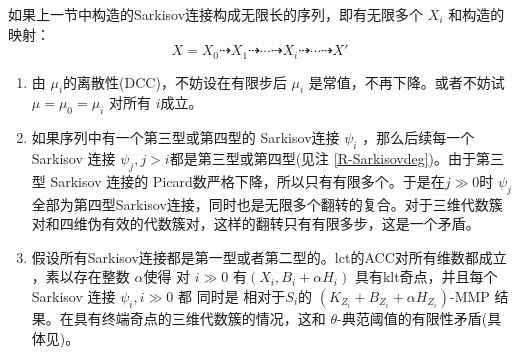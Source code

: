 如果上一节中构造的Sarkisov连接构成无限长的序列，即有无限多个 $ X_i $ 和构造的映射：
\[ X=X_0\dashrightarrow X_1\dashrightarrow \cdots\dashrightarrow X_i \dashrightarrow\cdots\dashrightarrow X'\]
\begin{enumerate}
  \item 由 $\mu_{i}$的离散性(DCC)，不妨设在有限步后 $\mu_{i}$ 是常值，不再下降。或者不妨试 $\mu=\mu_{0}=\mu_{i}$ 对所有 $i$成立。
  \item 如果序列中有一个第三型或第四型的 Sarkisov连接 $\psi_i$ ，那么后续每一个 Sarkisov 连接 $\psi_j, j>i$都是第三型或第四型(见注 \ref{R-Sarkisovdeg})。由于第三型 Sarkisov 连接的 Picard数严格下降，所以只有有限多个。于是在$j\gg 0$时 $\psi_j$ 全部为第四型Sarkisov连接，同时也是无限多个翻转的复合。对于三维代数簇对和四维伪有效的代数簇对，这样的翻转只有有限多步，这是一个矛盾。
  \item 假设所有Sarkisov连接都是第一型或者第二型的。lct的ACC对所有维数都成立 \cite{HMX14}，素以存在整数 $\alpha$使得 对 $i\gg 0$ 有$(X_i,B_i+\alpha H_i)$ 具有klt奇点，并且每个Sarkisov 连接 $\psi_i,i\gg 0$ 都 同时是 相对于$S_{i}$的  $(K_{Z_i}+B_{Z_i}+\alpha H_{Z_i})$-MMP 结果。在具有终端奇点的三维代数簇的情况，这和 $\theta$-典范阈值的有限性矛盾(具体见\cite[Claim 2.2]{brunoLogSarkisovProgram1995})。
\end{enumerate}

